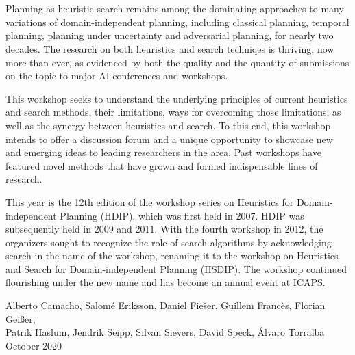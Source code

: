 \section*{}
Planning as heuristic search remains among the dominating approaches to many
variations of domain-independent planning, including classical planning,
temporal planning, planning under uncertainty and adversarial planning, for
nearly two decades. The research on both heuristics and search techniqes is
thriving, now more than ever, as evidenced by both the quality and the quantity
of submissions on the topic to major AI conferences and workshops.

This workshop seeks to understand the underlying principles of current
heuristics and search methods, their limitations, ways for overcoming those
limitations, as well as the synergy between heuristics and search. To this end,
this workshop intends to offer a discussion forum and a unique opportunity to
showcase new and emerging ideas to leading researchers in the area. Past
workshops have featured novel methods that have grown and formed indispensable
lines of research.

This year is the 12th edition of the workshop series on Heuristics for
Domain-independent Planning (HDIP), which was first held in 2007. HDIP
was subsequently held in 2009 and 2011. With the fourth workshop in
2012, the organizers sought to recognize the role of search algorithms
by acknowledging search in the name of the workshop, renaming it to
the workshop on Heuristics and Search for Domain-independent Planning
(HSDIP). The workshop continued flourishing under the new name and has
become an annual event at ICAPS.

\bigskip
\begin{flushright}
Alberto Camacho,
Salom\'{e} Eriksson,
Daniel Fie\v{s}er,
Guillem Franc\`es,
Florian Gei{\ss}er,
\\
Patrik Haslum,
Jendrik Seipp,
Silvan Sievers,
David Speck,
\'{A}lvaro Torralba
\\
October 2020
\end{flushright}
